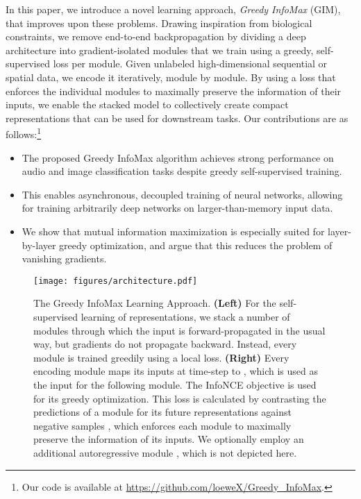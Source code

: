 \documentclass{article}
\begin{document}
In this paper, we introduce a novel learning approach, \textit{Greedy InfoMax} (GIM), that improves upon these problems. Drawing inspiration from biological constraints, we remove end-to-end backpropagation by dividing a deep architecture into gradient-isolated modules that we train using a greedy, self-supervised loss per module. Given unlabeled high-dimensional sequential or spatial data, we encode it iteratively, module by module. By using a loss that enforces the individual modules to maximally preserve the information of their inputs, we enable the stacked model to collectively create compact representations that can be used for downstream tasks. Our contributions are as follows:\footnote[1]{Our code is available at \href{https://github.com/loeweX/Greedy_InfoMax}{https://github.com/loeweX/Greedy\_InfoMax}.}
\begin{itemize}
	\item
	The proposed Greedy InfoMax algorithm achieves strong performance on audio and image classification tasks despite greedy self-supervised training. 

	\item
	This enables asynchronous, decoupled training of neural networks, allowing for training arbitrarily deep networks on larger-than-memory input data.
	
    \item We show that mutual information maximization is especially suited for layer-by-layer greedy optimization, and argue that this reduces the problem of vanishing gradients.
    






\end{itemize}

\begin{figure*}[t!]
\centering
\texttt{[image: figures/architecture.pdf]}
    \caption{The Greedy InfoMax Learning Approach. \textbf{(Left)} For the self-supervised learning of representations, we stack a number of modules through which the input is forward-propagated in the usual way, but gradients do not propagate backward. Instead, every module is trained greedily using a local loss. \textbf{(Right)} Every encoding module maps its inputs  at time-step  to , which is used as the input for the following module. The InfoNCE objective is used for its greedy optimization. This loss is calculated by contrasting the predictions of a module for its future representations  against negative samples , which enforces each module to maximally preserve the information of its inputs. We optionally employ an additional autoregressive module , which is not depicted here.}
    \label{fig:infomax}
\end{figure*} 
\end{document}
